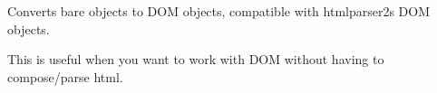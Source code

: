 Converts bare objects to D\+OM objects, compatible with htmlparser2\textquotesingle{}s D\+OM objects.

This is useful when you want to work with D\+OM without having to compose/parse html. 